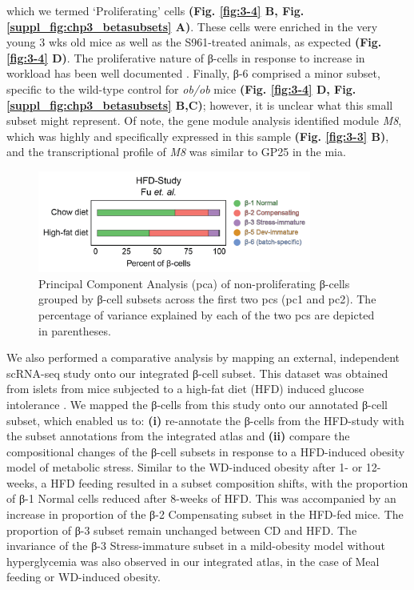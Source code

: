 which we termed ‘Proliferating’ cells \textbf{(Fig. \ref{fig:3-4} B, Fig. \ref{suppl_fig:chp3_betasubsets} A)}. These cells were enriched in the very young 3 wks old mice as well as the S961-treated animals, as expected \textbf{(Fig. \ref{fig:3-4} D)}. The proliferative nature of β-cells in response to increase in workload has been well documented \textbf{\cite{}}. Finally, β-6 comprised a minor subset, specific to the wild-type control for \textit{ob/ob} mice \textbf{(Fig. \ref{fig:3-4} D, Fig. \ref{suppl_fig:chp3_betasubsets} B,C)}; however, it is unclear what this small subset might represent. Of note, the gene module analysis identified module \textit{M8}, which was highly and specifically expressed in this sample \textbf{(Fig. \ref{fig:3-3} B)}, and the transcriptional profile of \textit{M8} was similar to GP25 in the \gls{mia}.\\

\begin{figure}
\includegraphics[width=9cm]{Chapter5/Fig/F3-1-v2-04.png}
\caption[PCA of Non-proliferating β-cell subsets]{Principal Component Analysis (\gls{pca}) of non-proliferating β-cells grouped by β-cell subsets across the first two \glspl{pc} (\gls{pc}1 and \gls{pc}2). The percentage of variance explained by each of the two \glspl{pc} are depicted in parentheses.}
\label{fig:chp3_hfdmapping}
\end{figure}


We also performed a comparative analysis by mapping an external, independent scRNA-seq study onto our integrated  β-cell subset. This dataset was obtained from islets from mice subjected to a high-fat diet (HFD) induced glucose intolerance \textbf{\cite{}}. We mapped the β-cells from this study onto our annotated β-cell subset, which enabled us to: \textbf{(i)} re-annotate the β-cells from the HFD-study with the subset annotations from the integrated atlas and \textbf{(ii)} compare the compositional changes of the β-cell subsets in response to a HFD-induced obesity model of metabolic stress. Similar to the WD-induced obesity after 1- or 12-weeks, a HFD feeding resulted in a subset composition shifts, with the proportion of β-1 Normal cells reduced after 8-weeks of HFD. This was accompanied by an increase in proportion of the β-2 Compensating subset in the HFD-fed mice. The proportion of β-3 subset remain unchanged between CD and HFD. The invariance of the β-3 Stress-immature subset in a mild-obesity model without hyperglycemia was also observed in our integrated atlas, in the case of Meal feeding or WD-induced obesity.\\


